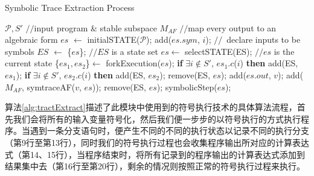 \begin{algorithm}[thb]
  \caption{Symbolic Trace Extraction Process}
  \label{alg:tractExtract}
\begin{algorithmic}[1]
\REQUIRE $\mathcal{P}, S'$ \hfill {{\footnotesize$//$}\small input program \& stable subspace}
\ENSURE $M_{AF}$ \hfill {{\footnotesize$//$}\small map every output to an algebraic form} %
    \STATE $es$ $\leftarrow$ initialSTATE($\mathcal{P}$);
      \STATE add($es.sym$, $i$); \hfill {{\footnotesize$//$}\small\ declare inputs to be symbols} \label{alg:tractExtract:input}
    \ENDFOR
    \STATE $ES$ $\leftarrow$ \{$es$\}; \hfill {{\footnotesize$//$}\small $ES$ is a state set}
     \label{alg:tractExtract:iter}
      \STATE $es \leftarrow$ selectSTATE(ES); \label{alg:tractExtract:select}  \hfill {{\footnotesize$//$}\small $es$ is the current state}
        \STATE \{$es_1,es_2$\}$\leftarrow$ forkExecution($es$);
        \STATE \textbf{if} {$\exists i \notin S'$, $es_1.c$($i$)} \textbf{then} add(ES, $es_1$);
        \STATE \textbf{if} {$\exists i \notin S'$, $es_2.c$($i$)} \textbf{then} add(ES, $es_2$);
        \STATE remove(ES, $es$);   \label{alg:tractExtract:forkend}
      \ENDCASE
        \STATE add($es.out$, $v$); \label{alg:tractExtract:outputv}
      \ENDCASE
          \STATE add($M_{AF}$, symtraceAF($v$, $es$)); \label{alg:tractExtract:recordexp} %
        \ENDFOR
        \STATE remove(ES, $es$);
      \ENDCASE
      \DEFAULT
        \STATE symbolicStep($es$); \label{alg:tractExtract:propagationstep}
      \ENDDEFAULT
      \ENDSWITCH  \label{alg:tractExtract:switend}
    \ENDWHILE \label{alg:tractExtract:iterend}
\end{algorithmic}
\end{algorithm}

算法\ref{alg:tractExtract}描述了此模块中使用到的符号执行技术的具体算法流程，首先我们会将所有的输入变量符号化，然后我们便一步步的以符号执行的方式执行程序。当遇到一条分支语句时，便产生不同的不同的执行状态以记录不同的执行分支（第9行至第13行），同时我们的符号执行过程也会收集程序输出所对应的计算表达式（第14、15行），当程序结束时，将所有记录到的程序输出的计算表达式添加到结果集中去（第16行至第20行），剩余的情况则按照正常的符号执行过程来执行。

